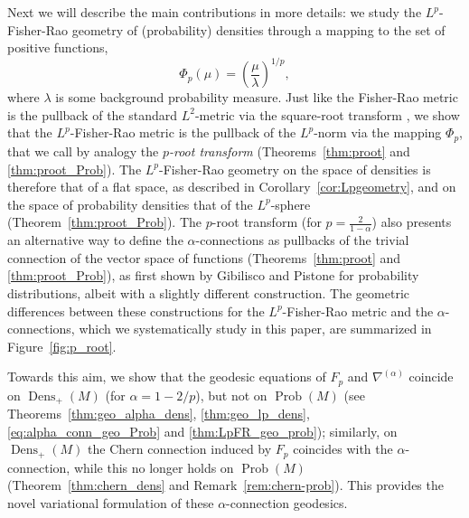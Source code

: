 \documentclass[11pt]{amsart}
\theoremstyle{definition}
\newcommand{\dx}{\lambda}
\newcommand{\Prob}{\operatorname{Prob}(M)}
\newcommand{\Dens}{\operatorname{Dens}_+(M)}
\begin{document}
Next we will describe the main contributions in more details: we study the $L^p$-Fisher-Rao geometry of (probability) densities through a mapping to the set of positive functions,
$$\Phi_p(\mu)=\left(\frac{\mu}{\dx}\right)^{1/p},$$
where $\dx$ is some background probability measure.
Just like the Fisher-Rao metric is the pullback of the standard $L^2$-metric via the square-root transform \cite{khesin2013geometry,bruveris2019geometry,gibilisco2020p},
we show that the $L^p$-Fisher-Rao metric is the pullback of the $L^p$-norm via the mapping $\Phi_p$, that we call by analogy the \emph{$p$-root transform} (Theorems~\ref{thm:proot} and \ref{thm:proot_Prob}). 
The $L^p$-Fisher-Rao geometry on the space of densities is therefore that of a flat space, as described in Corollary~\ref{cor:Lpgeometry}, and on the space of probability densities that of the $L^p$-sphere (Theorem~\ref{thm:proot_Prob}).   
The $p$-root transform (for $p = \frac{2}{1-\alpha}$) also presents an alternative way to define the $\alpha$-connections as pullbacks of the trivial connection of the vector space of functions (Theorems~\ref{thm:proot} and \ref{thm:proot_Prob}), as first shown by Gibilisco and Pistone \cite{gibilisco1998connections} for probability distributions, albeit with a slightly different construction.
The geometric differences between these constructions for the $L^p$-Fisher-Rao metric and the $\alpha$-connections, which we systematically study in this paper, are summarized in Figure~\ref{fig:p_root}.

Towards this aim, we show that the geodesic equations of $F_p$ and $\nabla^{(\alpha)}$ coincide on $\Dens$ (for $\alpha=1-2/p$), but not on $\Prob$ (see Theorems~\ref{thm:geo_alpha_dens}, \ref{thm:geo_lp_dens}, \ref{eq:alpha_conn_geo_Prob} and \ref{thm:LpFR_geo_prob});
similarly, on $\Dens$ the Chern connection induced by $F_p$ coincides with the $\alpha$-connection, while this no longer holds on $\Prob$ (Theorem~\ref{thm:chern_dens} and Remark~\ref{rem:chern-prob}).
This provides the novel variational formulation of these $\alpha$-connection geodesics.
\end{document}
